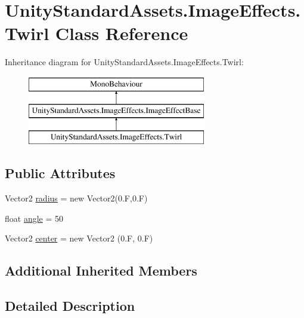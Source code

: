 \hypertarget{class_unity_standard_assets_1_1_image_effects_1_1_twirl}{}\section{Unity\+Standard\+Assets.\+Image\+Effects.\+Twirl Class Reference}
\label{class_unity_standard_assets_1_1_image_effects_1_1_twirl}
Inheritance diagram for Unity\+Standard\+Assets.\+Image\+Effects.\+Twirl\+:\begin{figure}[H]
\begin{center}
\leavevmode
\includegraphics[height=3.000000cm]{class_unity_standard_assets_1_1_image_effects_1_1_twirl}
\end{center}
\end{figure}
\subsection*{Public Attributes}
\begin{DoxyCompactItemize}
\item 
Vector2 \mbox{\hyperlink{class_unity_standard_assets_1_1_image_effects_1_1_twirl_afc518f269f3911fb92018723a1e36555}{radius}} = new Vector2(0.\+F,0.\+F)
\item 
float \mbox{\hyperlink{class_unity_standard_assets_1_1_image_effects_1_1_twirl_abd4cbc16b5f2cbabb830dbbf479dde74}{angle}} = 50
\item 
Vector2 \mbox{\hyperlink{class_unity_standard_assets_1_1_image_effects_1_1_twirl_acb5cbb5172906a0f3ae49e6ee1dbbdfc}{center}} = new Vector2 (0.\+F, 0.\+F)
\end{DoxyCompactItemize}
\subsection*{Additional Inherited Members}


\subsection{Detailed Description}



